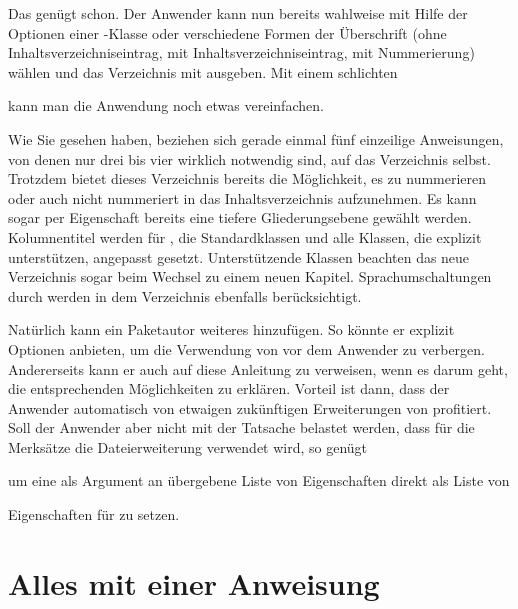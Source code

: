 Das genügt schon. Der Anwender kann nun bereits
wahlweise mit Hilfe der Optionen einer \KOMAScript-Klasse oder
 verschiedene Formen der Überschrift (ohne
Inhaltsverzeichniseintrag, mit Inhaltsverzeichniseintrag, mit Nummerierung)
wählen und das Verzeichnis mit
 ausgeben. Mit einem
schlichten
\begin{lstcode}
  \newcommand*{\listofremarkboxes}{\listoftoc{lor}}
\end{lstcode}
kann man die Anwendung noch etwas vereinfachen.

Wie Sie gesehen haben, beziehen sich gerade einmal fünf einzeilige
Anweisungen, von denen nur drei bis vier wirklich notwendig sind, auf das
Verzeichnis selbst. Trotzdem bietet dieses Verzeichnis bereits die
Möglichkeit, es zu nummerieren oder auch nicht nummeriert in das
Inhaltsverzeichnis aufzunehmen. Es kann sogar per Eigenschaft bereits eine
tiefere Gliederungsebene gewählt werden. Kolumnentitel werden für \KOMAScript,
die Standardklassen und alle Klassen, die  explizit
unterstützen, angepasst gesetzt. Unterstützende Klassen beachten das neue
Verzeichnis sogar beim Wechsel zu einem neuen Kapitel. Sprachumschaltungen
durch  werden in dem Verzeichnis ebenfalls berücksichtigt.

Natürlich kann ein Paketautor weiteres
hinzufügen. So könnte er explizit Optionen anbieten, um die Verwendung von
 vor dem Anwender zu verbergen. Andererseits
kann er auch auf diese Anleitung zu  verweisen, wenn es
darum geht, die entsprechenden Möglichkeiten zu erklären. Vorteil ist dann,
dass der Anwender automatisch von etwaigen zukünftigen Erweiterungen von
 profitiert. Soll der Anwender aber nicht mit der Tatsache
belastet werden, dass für die Merksätze die Dateierweiterung 
verwendet wird, so genügt
\begin{lstcode}
  \newcommand*{\setupremarkboxes}{\setuptoc{lor}}
\end{lstcode}
\iftrue%
um eine als Argument an  übergebene Liste von
Eigenschaften direkt als Liste von %
\else%
um über \Macro{setupremarkboxes}
\fi
Eigenschaften für  zu setzen.


\section{Alles mit einer Anweisung}

